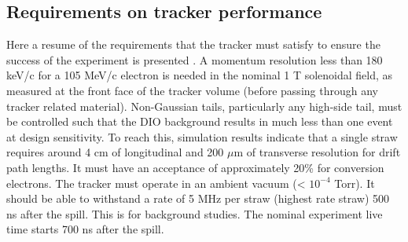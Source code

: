 \subsection{Requirements on tracker performance}
Here a resume of the requirements that the tracker must satisfy to ensure the 
success of the experiment is presented \cite{trkreq}.
A momentum resolution less than 180 keV/c for a 105 MeV/c electron is needed in the nominal
1 T solenoidal field, as measured at the front face of the tracker volume (before
passing through any tracker related material). Non-Gaussian tails, particularly any
high-side tail, must be controlled such that the DIO background results in much less
than one event at design sensitivity. To reach this, simulation results indicate that 
a single straw requires around 4 cm of longitudinal and 200 $\mu$m of transverse 
resolution for drift path lengths. 
It must have an acceptance of approximately 20\% for conversion electrons.
The tracker must operate in an ambient vacuum (< $10^{-4}$ Torr).
It should be able to withstand a rate of 5 MHz per straw (highest rate straw) 
500 ns after the spill. This is
for background studies. The nominal experiment live time starts 700 ns after the spill.
